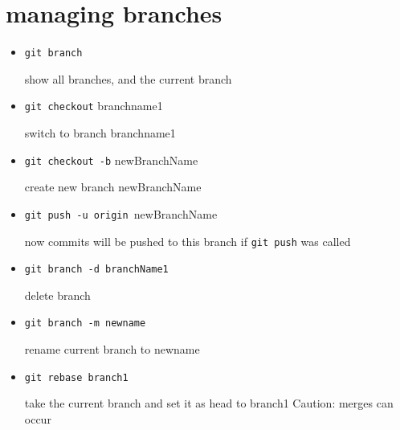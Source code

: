 \documentclass[ twoside,openright,titlepage,numbers=noenddot,headinclude,%
                footinclude=true, cleardoublepage=empty,abstractoff, %
                BCOR=5mm,paper=a4,fontsize=11pt,%
                ]{scrreprt}
\begin{document}
\section{managing branches}
	\begin{itemize}
		\item \texttt{git branch}
			
			show all branches, and the current branch
		\item \texttt{git checkout} branchname1
			
			switch to branch branchname1
		\item \texttt{git checkout -b} newBranchName
		
			create new branch newBranchName
		\item \texttt{git push -u origin }newBranchName
			
			now commits will be pushed to this branch if \texttt{git push} was called
			
		\item \texttt{git branch -d branchName1}
			
			delete branch
		
		\item \texttt{git branch -m newname}
			
			rename current branch to newname
			
		\item \texttt{git rebase branch1}
		
			take the current branch and set it as head to branch1
			Caution: merges can occur
	\end{itemize}
\end{document}
